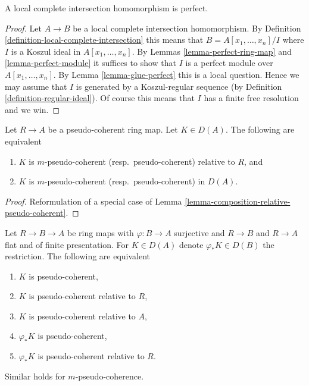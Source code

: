 \begin{lemma}
\label{lemma-lci-perfect}
A local complete intersection homomorphism is perfect.
\end{lemma}

\begin{proof}
Let $A \to B$ be a local complete intersection homomorphism.
By Definition \ref{definition-local-complete-intersection} this
means that $B = A[x_1, \ldots, x_n]/I$ where $I$ is a Koszul ideal
in $A[x_1, \ldots, x_n]$. 
By Lemmas \ref{lemma-perfect-ring-map} and \ref{lemma-perfect-module}
it suffices to show that $I$ is a perfect module over $A[x_1, \ldots, x_n]$.
By Lemma \ref{lemma-glue-perfect} this is a local question. Hence we
may assume that $I$ is generated by a Koszul-regular sequence (by
Definition \ref{definition-regular-ideal}).
Of course this means that $I$ has a finite free resolution and we win.
\end{proof}

\begin{lemma}
\label{lemma-relative-pseudo-coherent-is-moot}
Let $R \to A$ be a pseudo-coherent ring map. Let $K \in D(A)$.
The following are equivalent
\begin{enumerate}
\item $K$ is $m$-pseudo-coherent (resp.\ pseudo-coherent) relative to $R$, and
\item $K$ is $m$-pseudo-coherent (resp.\ pseudo-coherent) in $D(A)$.
\end{enumerate}
\end{lemma}

\begin{proof}
Reformulation of a special case of
Lemma \ref{lemma-composition-relative-pseudo-coherent}.
\end{proof}

\begin{lemma}
\label{lemma-more-relative-pseudo-coherent-is-moot}
Let $R \to B \to A$ be ring maps with $\varphi : B \to A$ surjective and
$R \to B$ and $R \to A$ flat and of finite presentation. For $K \in D(A)$
denote $\varphi_*K \in D(B)$ the restriction.
The following are equivalent
\begin{enumerate}
\item $K$ is pseudo-coherent,
\item $K$ is pseudo-coherent relative to $R$,
\item $K$ is pseudo-coherent relative to $A$,
\item $\varphi_*K$ is pseudo-coherent,
\item $\varphi_*K$ is pseudo-coherent relative to $R$.
\end{enumerate}
Similar holds for $m$-pseudo-coherence.
\end{lemma}

